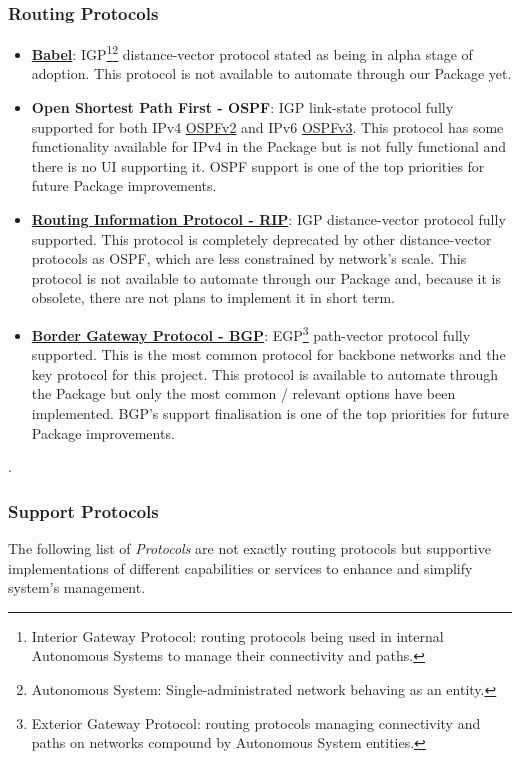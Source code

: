 \subsubsection{Routing Protocols}
\begin{itemize}
    \item \textbf{\href{https://www.irif.fr/~jch//software/babel/}{Babel}}: IGP\footnote{Interior Gateway Protocol: routing protocols being used in internal Autonomous Systems to manage their connectivity and paths.}\footnote{Autonomous System: Single-administrated network behaving as an entity.} distance-vector protocol stated as being in alpha stage of adoption.
    This protocol is not available to automate through our Package yet.
    \item \textbf{Open Shortest Path First - OSPF}: IGP link-state protocol fully supported for both IPv4 \href{https://tools.ietf.org/html/rfc2328}{OSPFv2} and IPv6 \href{https://tools.ietf.org/html/rfc5340}{OSPFv3}.
    This protocol has some functionality available for IPv4 in the Package but is not fully functional and there is no UI supporting it. OSPF support is one of the top priorities for future Package improvements.
    \item \textbf{\href{https://www.rfc-editor.org/rfc/rfc2453.txt}{Routing Information Protocol - RIP}}: IGP distance-vector protocol fully supported. This protocol is completely deprecated by other distance-vector protocols as OSPF, which are less constrained by network's scale.
    This protocol is not available to automate through our Package and, because it is obsolete, there are not plans to implement it in short term.
    \item \textbf{\href{https://www.rfc-editor.org/rfc/rfc4271.txt}{Border Gateway Protocol - BGP}}: EGP\footnote{Exterior Gateway Protocol: routing protocols managing connectivity and paths on networks compound by Autonomous System entities.} path-vector protocol fully supported. This is the most common protocol for backbone networks and the key protocol for this project.
    This protocol is available to automate through the Package but only the most common / relevant options have been implemented. BGP's support finalisation is one of the top priorities for future Package improvements. 
\end{itemize}.

\subsubsection{Support Protocols}
\label{sub:sub:supproto}
The following list of \textit{Protocols} are not exactly routing protocols but supportive implementations of different capabilities or services to enhance and simplify system's management.

